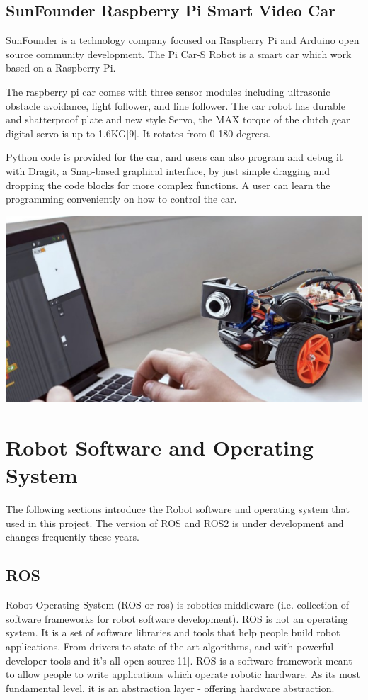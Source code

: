 \documentclass{mproj}
\begin{document}
\subsection{SunFounder Raspberry Pi Smart Video Car}

SunFounder is a technology company focused on Raspberry Pi and Arduino open source
community development. The Pi Car-S Robot is a smart car which work based on a Raspberry Pi.

The raspberry pi car comes with three sensor modules including ultrasonic obstacle avoidance, light follower, and line follower. The car robot has durable and shatterproof plate and new style Servo, the MAX torque of the clutch gear digital servo is up to 1.6KG[9]. It rotates from 0-180 degrees.

Python code is provided for the car, and users can also program and debug it with Dragit, a Snap-based graphical interface, by just simple dragging and dropping the code blocks for more complex functions. A user can learn the programming conveniently on how to control the car.

\includegraphics[width = .7\textwidth]{a.jpg}

\section{Robot Software and Operating System}
The following sections introduce the Robot software and operating system that used in this project. The version of ROS and ROS2 is under development and changes frequently these years.

\subsection{ROS}
Robot Operating System (ROS or ros) is robotics middleware (i.e. collection of software frameworks for robot software development). ROS is not an operating system. It is a set of software libraries and tools that help people build robot applications. From drivers to state-of-the-art algorithms, and with powerful developer tools and it’s all open source[11]. ROS is a software framework meant to allow people to write applications which operate robotic hardware. As its most fundamental level, it is an abstraction layer - offering hardware abstraction.  
\end{document}
